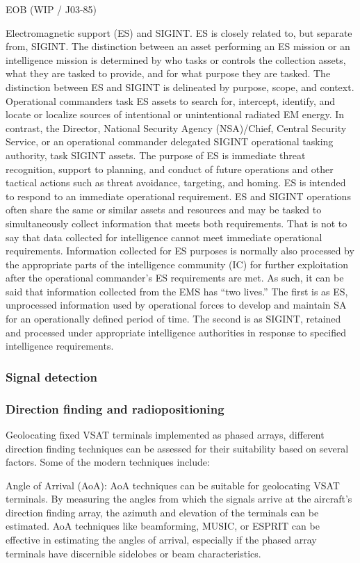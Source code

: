 \documentclass[english, 12pt, a4paper, elec, utf8, a-1b, online]{aaltothesis}
\begin{document}
EOB (WIP / J03-85)

Electromagnetic support (ES) and SIGINT.
ES is closely related to, but separate from, SIGINT.
The distinction between an asset performing an ES mission or an intelligence mission is
determined by who tasks or controls the collection assets, what they are tasked to provide,
and for what purpose they are tasked.
The distinction between ES and SIGINT is
delineated by purpose, scope, and context.
Operational commanders task ES assets to
search for, intercept, identify, and locate or localize sources of intentional or unintentional
radiated EM energy.
In contrast, the Director, National Security Agency (NSA)/Chief,
Central Security Service, or an operational commander delegated SIGINT operational
tasking authority, task SIGINT assets.
The purpose of ES is immediate threat recognition,
support to planning, and conduct of future operations and other tactical actions such as
threat avoidance, targeting, and homing.
ES is intended to respond to an immediate
operational requirement.
ES and SIGINT operations often share the same or similar assets
and resources and may be tasked to simultaneously collect information that meets both
requirements.
That is not to say that data collected for intelligence cannot meet immediate
operational requirements.
Information collected for ES purposes is normally also
processed by the appropriate parts of the intelligence community (IC) for further
exploitation after the operational commander’s ES requirements are met.
As such, it can
be said that information collected from the EMS has “two lives.” The first is as ES,
unprocessed information used by operational forces to develop and maintain SA for an
operationally defined period of time.
The second is as SIGINT, retained and processed
under appropriate intelligence authorities in response to specified intelligence
requirements.

\subsubsection{Signal detection}
\subsubsection{Direction finding and radiopositioning}
Geolocating fixed VSAT terminals implemented as phased arrays, different direction finding techniques can be assessed for their suitability based on several factors.
Some of the modern techniques include:

Angle of Arrival (AoA): AoA techniques can be suitable for geolocating VSAT terminals.
By measuring the angles from which the signals arrive at the aircraft's direction finding array, the azimuth and elevation of the terminals can be estimated.
AoA techniques like beamforming, MUSIC, or ESPRIT can be effective in estimating the angles of arrival, especially if the phased array terminals have discernible sidelobes or beam characteristics.
\end{document}
